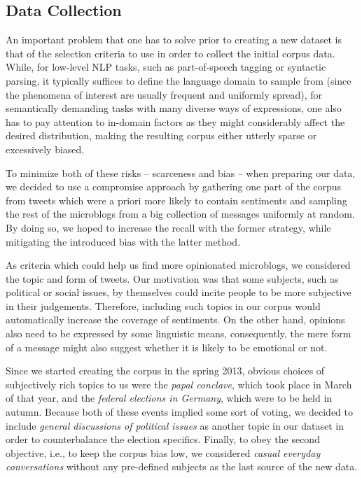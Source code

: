 \subsection{Data Collection}

An important problem that one has to solve prior to creating a new
dataset is that of the selection criteria to use in order to collect
the initial corpus data.  While, for low-level NLP tasks, such as
part-of-speech tagging or syntactic parsing, it typically suffices to
define the language domain to sample from (since the phenomena of
interest are usually frequent and uniformly spread), for semantically
demanding tasks with many diverse ways of expressions, one also has to
pay attention to in-domain factors as they might considerably affect
the desired distribution, making the resulting corpus either utterly
sparse or excessively biased.

To minimize both of these risks -- scarceness and bias -- when
preparing our data, we decided to use a compromise approach by
gathering one part of the corpus from tweets which were a priori more
likely to contain sentiments and sampling the rest of the microblogs
from a big collection of messages uniformly at random.  By doing so,
we hoped to increase the recall with the former strategy, while
mitigating the introduced bias with the latter method.

As criteria which could help us find more opinionated microblogs, we
considered the topic and form of tweets.  Our motivation was that some
subjects, such as political or social issues, by themselves could
incite people to be more subjective in their judgements.  Therefore,
including such topics in our corpus would automatically increase the
coverage of sentiments.  On the other hand, opinions also need to be
expressed by some linguistic means, consequently, the mere form of a
message might also suggest whether it is likely to be emotional or
not.

Since we started creating the corpus in the spring 2013, obvious
choices of subjectively rich topics to us were the \emph{papal
  conclave}, which took place in March of that year, and the
\emph{federal elections in Germany}, which were to be held in autumn.
Because both of these events implied some sort of voting, we decided
to include \emph{general discussions of political issues} as another
topic in our dataset in order to counterbalance the election
specifics.  Finally, to obey the second objective, i.e., to keep the
corpus bias low, we considered \emph{casual everyday conversations}
without any pre-defined subjects as the last source of the new data.

